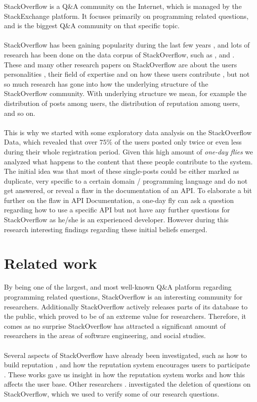 \documentclass[conference]{IEEEtran}
\begin{document}
StackOverflow is a Q\&A community on the Internet, which is managed by the StackExchange platform. It focuses primarily on programming related questions, and is the biggest Q\&A community on that specific topic.
\\
\\
StackOverflow has been gaining popularity during the last few years \cite{anderson2012discovering}, and lots of research has been done on the data corpus of StackOverflow, such as \cite{treude2011programmers}, \cite{barua2014developers} and \cite{morrison2013age}. These and many other research papers on StackOverflow are about the users personalities \cite{bosu2013building}, their field of expertise and on how these users contribute \cite{movshovitz2013analysis}, but not so much research has gone into how the underlying structure of the StackOverflow community. With underlying structure we mean, for example the distribution of posts among users, the distribution of reputation among users, and so on.
\\
\\
This is why we started with some exploratory data analysis on the StackOverflow Data, which revealed that over $75\%$ of the users posted only twice or even less during their whole registration period. Given this high amount of  \textit{one-day flies} we analyzed what happens to the content that these people contribute to the system. The initial idea was that most of these single-posts could be either marked as duplicate, very specific to a certain domain / programming language and do not get answered, or reveal a flaw in the documentation of an API. To elaborate a bit further on the flaw in API Documentation, a one-day fly can ask a question regarding how to use a specific API but not have any further questions for StackOverflow as he/she is an experienced developer. However during this research interesting findings regarding these initial beliefs emerged.


\section{Related work}

By being one of the largest, and most well-known Q\&A platform regarding programming related questions, StackOverflow is an interesting community for researchers. Additionally StackOverflow actively releases parts of its database to the public, which proved to be of an extreme value for researchers. Therefore, it comes as no surprise StackOverflow has attracted a significant amount of researchers in the areas of software engineering,
 and social studies.
\\
\\
Several aspects of StackOverflow have already been investigated, such as how to build reputation \cite{bosu2013building}, and how the reputation system encourages users to participate \cite{movshovitz2013analysis}. These works gave us insight in how the reputation system works and how this affects the user base. Other researchers \cite{correa2014chaff}. investigated the deletion of questions on StackOverflow, which we used to verify some of our research questions. 
\end{document}
